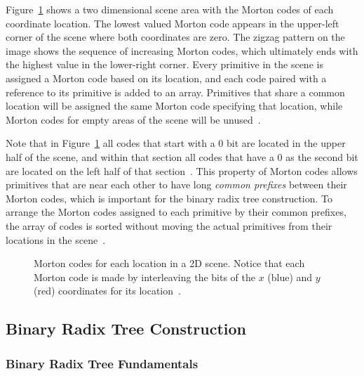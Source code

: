 \documentclass{sig-alternate}
\begin{document}
Figure~\ref{fig:MortonCodeFigure} shows a two dimensional scene area with the Morton codes of each coordinate location. The lowest valued Morton code appears in the upper-left corner of the scene where both coordinates are zero. The zigzag pattern on the image shows the sequence of increasing Morton codes, which ultimately ends with the highest value in the lower-right corner. Every primitive in the scene is assigned a Morton code based on its location, and each code paired with a reference to its primitive is added to an array. Primitives that share a common location will be assigned the same Morton code specifying that location, while Morton codes for empty areas of the scene will be unused~\cite{Karras:2012, Viitanen:2015}.

Note that in Figure~\ref{fig:MortonCodeFigure} all codes that start with a 0 bit are located in the upper half of the scene, and within that section all codes that have a 0 as the second bit are located on the left half of that section~\cite{Garanzha:2011}. This property of Morton codes allows primitives that are near each other to have long \emph{common prefixes} between their Morton codes, which is important for the binary radix tree construction. To arrange the Morton codes assigned to each primitive by their common prefixes, the array of codes is sorted without moving the actual primitives from their locations in the scene~\cite{Viitanen:2015}.

\begin{figure}
\centering
{}
\caption{Morton codes for each location in a 2D scene. Notice that each Morton code is made by interleaving the bits of the $x$ (blue) and $y$ (red) coordinates for its location~\cite{wiki:morton}.}
\label{fig:MortonCodeFigure}
\end{figure} 

\subsection{Binary Radix Tree Construction}
\label{sec:brts}

\subsubsection{Binary Radix Tree Fundamentals}
\label{sec:brtFundamentals}
\end{document}
